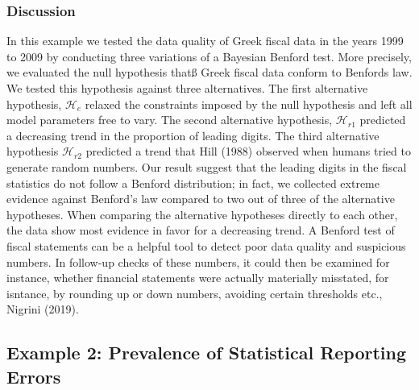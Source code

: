 \documentclass[
  english,
  man,floatsintext]{apa6}
\begin{document}
\hypertarget{discussion}{%
\subsubsection{Discussion}\label{discussion}}

In this example we tested the data quality of Greek fiscal data in the years 1999 to 2009 by conducting three variations of a Bayesian Benford test. More precisely, we evaluated the null hypothesis thatß Greek fiscal data conform to Benfords law. We tested this hypothesis against three alternatives. The first alternative hypothesis, \(\mathcal{H}_e\) relaxed the constraints imposed by the null hypothesis and left all model parameters free to vary. The second alternative hypothesis, \(\mathcal{H}_{r1}\) predicted a decreasing trend in the proportion of leading digits. The third alternative hypothesis \(\mathcal{H}_{r2}\) predicted a trend that Hill (1988) observed when humans tried to generate random numbers. Our result suggest that the leading digits in the fiscal statistics do not follow a Benford distribution; in fact, we collected extreme evidence against Benford's law compared to two out of three of the alternative hypotheses. When comparing the alternative hypotheses directly to each other, the data show most evidence in favor for a decreasing trend. A Benford test of fiscal statements can be a helpful tool to detect poor data quality and suspicious numbers. In follow-up checks of these numbers, it could then be examined for instance, whether financial statements were actually materially misstated, for isntance, by rounding up or down numbers, avoiding certain thresholds etc., Nigrini (2019).

\hypertarget{example-2-prevalence-of-statistical-reporting-errors}{%
\subsection{Example 2: Prevalence of Statistical Reporting Errors}\label{example-2-prevalence-of-statistical-reporting-errors}}
\end{document}
